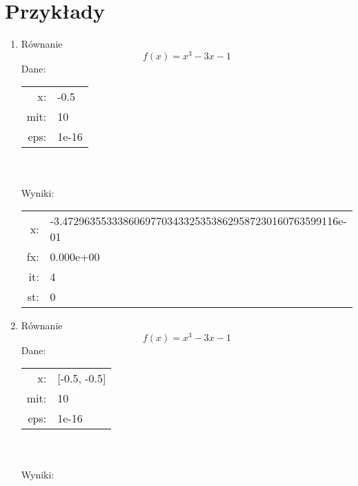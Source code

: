 \documentclass[11pt]{article}
\begin{document}
\section{Przykłady}
    \begin{enumerate}
        \item Równanie
        $$f(x) = x^3 - 3x -1$$
        Dane:\\
        \begin{tabular}{r|l}
            
            x:&-0.5\\
            mit:&10\\
            eps:&1e-16\\
            \hline
        \end{tabular}\\\\
        Wyniki:\\
        \begin{tabular}{r|l}
            
            x:&-3.47296355333860697703433253538629587230160763599116e-01\\
            fx:&0.000e+00\\
            it:&4\\
            st:&0\\
            \hline
        \end{tabular}
        \item Równanie
        $$f(x) = x^3 - 3x -1$$
        Dane:\\
        \begin{tabular}{r|l}
            
            x:&[-0.5, -0.5]\\
            mit:&10\\
            eps:&1e-16\\
            \hline
        \end{tabular}\\\\
        Wyniki:\\
        \begin{tabular}{r|l}
            

\end{tabular}
\end{enumerate}
\end{document}

